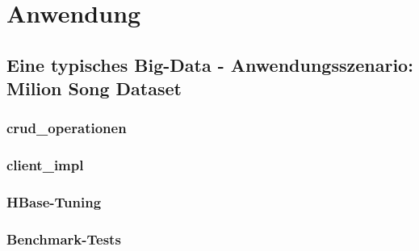 \chapter{Anwendung}
\section{Eine typisches Big-Data -  Anwendungsszenario: Milion Song Dataset}



\subsection{crud_operationen}
\subsection{client_impl}
\subsection{HBase-Tuning}
\subsection{Benchmark-Tests}